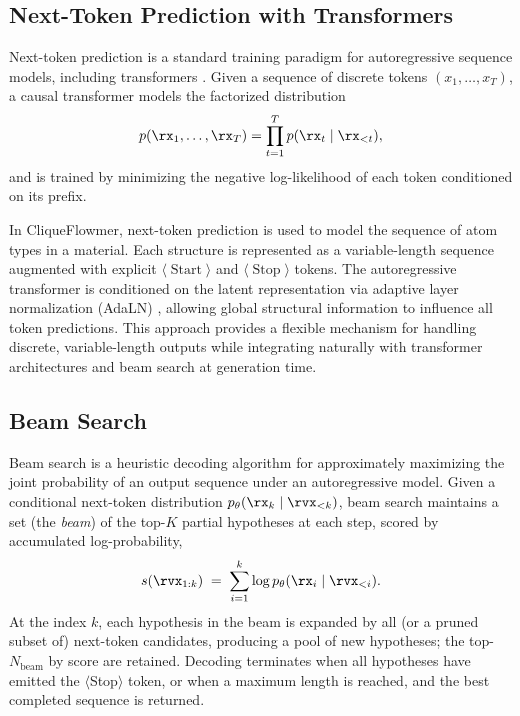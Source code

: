 \documentclass{article}
\theoremstyle{plain}
\theoremstyle{definition}
\theoremstyle{remark}
\begin{document}
\subsection{Next-Token Prediction with Transformers}
\label{sec:appendix-ntp}

Next-token prediction is a standard training paradigm for autoregressive sequence models, including transformers \citep{vaswani2017attention}. Given a sequence of discrete tokens $(x_1,\dots,x_T)$, a causal transformer models the factorized distribution
\begin{align}
    p(\rx_1,\dots,\rx_T) = \prod_{t=1}^T p(\rx_t \mid \rx_{<t}), \nonumber
\end{align}
and is trained by minimizing the negative log-likelihood of each token conditioned on its prefix.

In CliqueFlowmer, next-token prediction is used to model the sequence of atom types in a material. Each structure is represented as a variable-length sequence augmented with explicit $\langle\operatorname{Start}\rangle$ and $\langle\operatorname{Stop}\rangle$ tokens. The autoregressive transformer is conditioned on the latent representation via adaptive layer normalization (AdaLN) \citep{peebles2023scalable}, allowing global structural information to influence all token predictions. This approach provides a flexible mechanism for handling discrete, variable-length outputs while integrating naturally with transformer architectures and beam search at generation time.

\subsection{Beam Search}
\label{app:beam}
Beam search \cite{wu2016googles} is a heuristic decoding algorithm for approximately maximizing the joint probability of an output sequence under an autoregressive model. Given a conditional next-token distribution $p_\theta(\rx_{k}\mid \rvx_{<k})$, beam search maintains a set (the \emph{beam}) of the top-$K$ partial hypotheses at each step, scored by accumulated log-probability,
\begin{align}
    s(\rvx_{1:k}) \;=\; \sum_{i=1}^{k} \log p_\theta(\rx_i \mid \rvx_{<i}).\nonumber
\end{align}
At the index $k$, each hypothesis in the beam is expanded by all (or a pruned subset of) next-token candidates, producing a pool of new hypotheses; the top-$N_{\text{beam}}$ by score are retained. Decoding terminates when all hypotheses have emitted the {$\langle$Stop$\rangle$} token, or when a maximum length is reached, and the best completed sequence is returned. 
\end{document}
